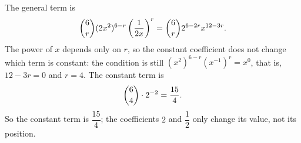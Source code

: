 The general term is
\[
\dbinom6r(2x^2)^{6-r}\left(\dfrac{1}{2x}\right)^r=\dbinom6r2^{6-2r}x^{12-3r}.
\]
The power of $x$ depends only on $r$, so the constant coefficient does not change which term is constant: the condition is still $(x^2)^{6-r}(x^{-1})^r=x^0$, that is, $12-3r=0$ and $r=4$. The constant term is
\[
\dbinom64\cdot2^{-2}=\dfrac{15}{4}.
\]
So the constant term is $\boxed{\dfrac{15}{4}}$; the coefficients $2$ and $\dfrac{1}{2}$ only change its value, not its position.
